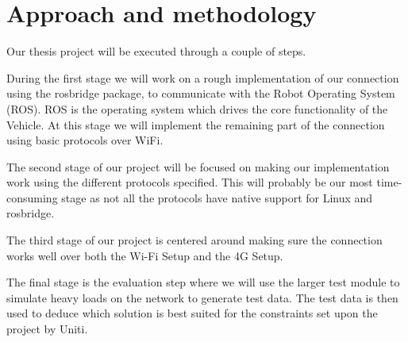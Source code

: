 \documentclass[a4paper]{article}
\begin{document}
\section{Approach and methodology}


Our thesis project will be executed through a couple of steps.

During the first stage we will work on a rough implementation of our connection
using the rosbridge package, to communicate with the Robot Operating System
(ROS). ROS is the operating system which drives the core functionality of the 
Vehicle. At this stage we will implement the remaining part of the connection
using basic protocols over WiFi.

The second stage of our project will be focused on making our implementation 
work using the different protocols specified. This will probably be our most 
time-consuming stage as not all the protocols have native support for Linux and
rosbridge.

The third stage of our project is centered around making sure the connection 
works well over both the Wi-Fi Setup and the 4G Setup.

The final stage is the evaluation step where we will use the larger test module
to simulate heavy loads on the network to generate test data. The test data is
then used to deduce which solution is best suited for the constraints set upon
the project by Uniti.




\end{document}
